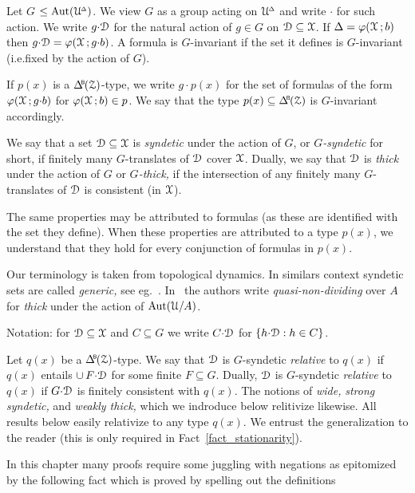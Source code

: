 Let \emph{$G$\/} $\le{\rm Aut}(\EuScript U\kern-.2ex^{\scriptscriptstyle\Delta})$.
We view $G$ as a group acting on $\EuScript U\kern-.2ex^{\scriptscriptstyle\Delta}$ and write ${\cdot}$ for such action.
We write $g{\cdot}\EuScript D$ for the natural action of $g\in G$ on $\EuScript D\subseteq\EuScript X$.
If $\Delta=\varphi(\EuScript X\,;b)$ then $g{\cdot}\EuScript D=\varphi(\EuScript X\,;g{\cdot}b)$.
A formula is $G$-invariant if the set it defines is $G$-invariant (i.e.\@ fixed by the action of $G$).

If $p(x)$ is a $\BDelta(\Z)$-type, we write $g{\cdot}p(x)$ for the set of formulas of the form $\varphi(\EuScript X\,;g{\cdot}b)$ for $\varphi(\EuScript X\,;b)\in p$.
We say that the type $p(x)\subseteq\BDelta(\Z)$ is $G$-invariant accordingly.

We say that a set $\EuScript D\subseteq\EuScript X$ is \emph{syndetic\/} under the action of $G$, or \emph{$G$-syndetic\/} for short, if finitely many $G$-translates of $\EuScript D$ cover $\EuScript X$.
Dually, we say that $\EuScript D$ is \emph{thick\/} under the action of $G$ or \emph{$G$-thick,} if the intersection of any finitely many $G$-translates of $\EuScript D$ is consistent (in $\EuScript X$).

The same properties may be attributed to formulas (as these are identified with the set they define).
When these properties are attributed to a type $p(x)$, we understand that they hold for every conjunction of formulas in $p(x)$.

Our terminology is taken from topological dynamics.
In similars context syndetic sets are called \textit{generic,} see eg.~\cite{Ne}.
In~\cite{CK} the authors write \textit{quasi-non-dividing\/} over $A$ for \textit{thick\/} under the action of ${\rm Aut}(\EuScript U/A)$.

Notation: for $\EuScript D\subseteq\EuScript X$ and $C\subseteq G$ we write \emph{$C{\cdot}\EuScript D$\/} for $\{h{\cdot}\EuScript D: h\in C\}$.

\begin{remark}\label{rem_relative}
Let $q(x)$ be a $\BDelta(\Z)$-type.
We say that $\EuScript D$ is $G$-syndetic \emph{relative\/} to $q(x)$ if $q(x)$ entails $\cup\,F{\cdot}\EuScript D$ for some finite $F\subseteq G$.
Dually, $\EuScript D$ is $G$-syndetic \emph{relative\/} to $q(x)$ if $G{\cdot}\EuScript D$ is finitely consistent with $q(x)$.
The notions of \textit{wide,\/} \textit{strong syndetic,\/} and \textit{weakly thick,\/}  which we indroduce below relitivize likewise.
All results below easily relativize to any type $q(x)$.
We entrust the generalization to the reader (this is only required in Fact~\ref{fact_stationarity}).
\end{remark}

In this chapter many proofs require some juggling with negations as epitomized by the following fact which is proved by spelling out the definitions

